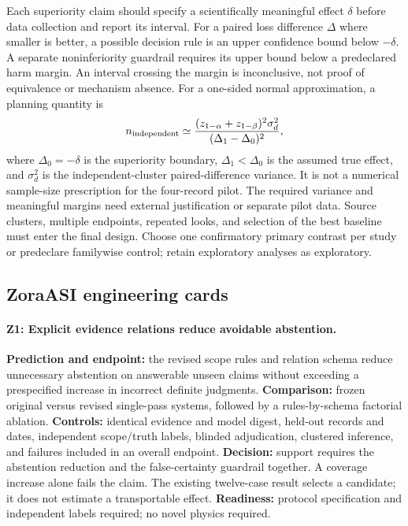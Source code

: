 Each superiority claim should specify a scientifically meaningful effect $\delta$ before data collection and report its interval. For a paired loss difference $\Delta$ where smaller is better, a possible decision rule is an upper confidence bound below $-\delta$. A separate noninferiority guardrail requires its upper bound below a predeclared harm margin. An interval crossing the margin is inconclusive, not proof of equivalence or mechanism absence. For a one-sided normal approximation, a planning quantity is
\begin{equation}
 n_{\rm independent}\simeq
 \frac{(z_{1-\alpha}+z_{1-\beta})^2\sigma_d^2}{(\Delta_1-\Delta_0)^2},
\end{equation}
where $\Delta_0=-\delta$ is the superiority boundary, $\Delta_1<\Delta_0$ is the assumed true effect, and $\sigma_d^2$ is the independent-cluster paired-difference variance. It is not a numerical sample-size prescription for the four-record pilot. The required variance and meaningful margins need external justification or separate pilot data. Source clusters, multiple endpoints, repeated looks, and selection of the best baseline must enter the final design. Choose one confirmatory primary contrast per study or predeclare familywise control; retain exploratory analyses as exploratory.

\subsection{ZoraASI engineering cards}
\paragraph{Z1: Explicit evidence relations reduce avoidable abstention.}
\textbf{Prediction and endpoint:} the revised scope rules and relation schema reduce unnecessary abstention on answerable unseen claims without exceeding a prespecified increase in incorrect definite judgments. \textbf{Comparison:} frozen original versus revised single-pass systems, followed by a rules-by-schema factorial ablation. \textbf{Controls:} identical evidence and model digest, held-out records and dates, independent scope/truth labels, blinded adjudication, clustered inference, and failures included in an overall endpoint. \textbf{Decision:} support requires the abstention reduction and the false-certainty guardrail together. A coverage increase alone fails the claim. The existing twelve-case result selects a candidate; it does not estimate a transportable effect. \textbf{Readiness:} protocol specification and independent labels required; no novel physics required.

